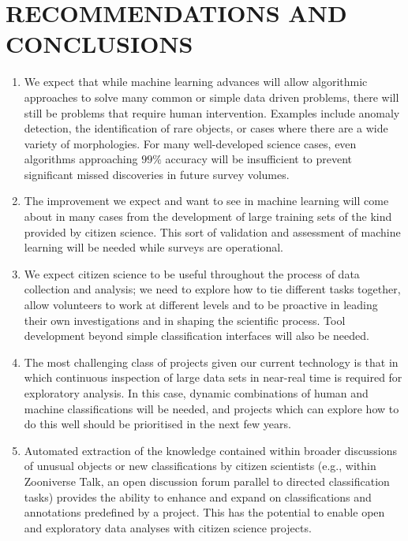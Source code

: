\documentclass{pasa}
\begin{document}
\section{RECOMMENDATIONS AND CONCLUSIONS}
\label{sec:conclusions}

\begin{enumerate} 

\item We expect that while machine learning advances will allow algorithmic approaches to solve many common or simple data driven problems, there will still be problems that require human intervention. Examples include anomaly detection, the identification of rare objects, or cases where there are a wide variety of morphologies. For many well-developed science cases, even algorithms approaching $99\%$ accuracy will be insufficient to prevent significant missed discoveries in future survey volumes.

\item The improvement we expect and want to see in machine learning will come about in many cases from the development of large training sets of the kind provided by citizen science.  This sort of validation and assessment of machine learning will be needed while surveys are operational. 

\item We expect citizen science to be useful throughout the process of data collection and analysis; we need to explore how to tie different tasks together, allow volunteers to work at different levels and to be proactive in leading their own investigations and in shaping the scientific process. Tool development beyond simple classification interfaces will also be needed. 

\item The most challenging class of projects given our current technology is that in which continuous inspection of large data sets in near-real time is required for exploratory analysis. In this case, dynamic combinations of human and machine classifications will be needed, and projects which can explore how to do this well should be prioritised in the next few years. 

\item Automated extraction of the knowledge contained within broader discussions of unusual objects or new classifications by citizen scientists (e.g., within Zooniverse Talk, an open discussion forum parallel to directed classification tasks) provides the ability to enhance and expand on classifications and annotations predefined by a project. This has the potential to enable open and exploratory data analyses with citizen science projects.


\end{enumerate}
\end{document}
